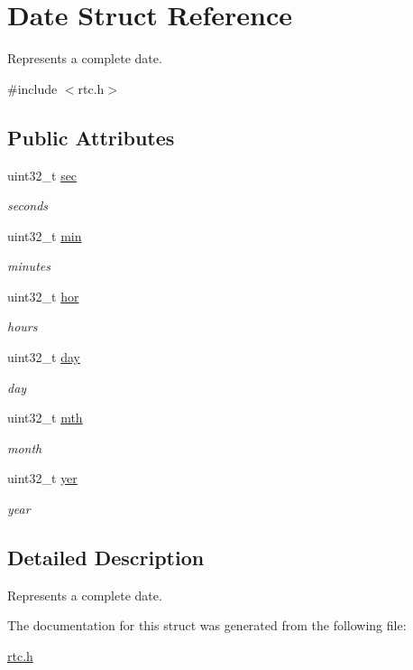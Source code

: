 \hypertarget{struct_date}{}\section{Date Struct Reference}
\label{struct_date}


Represents a complete date.  




{\ttfamily \#include $<$rtc.\+h$>$}

\subsection*{Public Attributes}
\begin{DoxyCompactItemize}
\item 
uint32\+\_\+t \mbox{\hyperlink{group__rtc_gad1dd4ea2eac5b95869aecea036e93d93}{sec}}
\begin{DoxyCompactList}\small\item\em seconds \end{DoxyCompactList}\item 
uint32\+\_\+t \mbox{\hyperlink{group__rtc_gad11927da04c378087cb0cf44cbf25759}{min}}
\begin{DoxyCompactList}\small\item\em minutes \end{DoxyCompactList}\item 
uint32\+\_\+t \mbox{\hyperlink{group__rtc_gaa5ba3c37c4f61fa5ec64580241ecdb4c}{hor}}
\begin{DoxyCompactList}\small\item\em hours \end{DoxyCompactList}\item 
uint32\+\_\+t \mbox{\hyperlink{group__rtc_gab435b6ac408b48a2edc5838cdc8aa914}{day}}
\begin{DoxyCompactList}\small\item\em day \end{DoxyCompactList}\item 
uint32\+\_\+t \mbox{\hyperlink{group__rtc_ga9441c8119c91c63a623ab4bb3a42e340}{mth}}
\begin{DoxyCompactList}\small\item\em month \end{DoxyCompactList}\item 
uint32\+\_\+t \mbox{\hyperlink{group__rtc_ga8bc3e3b0d57e50d6d4c62f76922de55e}{yer}}
\begin{DoxyCompactList}\small\item\em year \end{DoxyCompactList}\end{DoxyCompactItemize}


\subsection{Detailed Description}
Represents a complete date. 

The documentation for this struct was generated from the following file\+:\begin{DoxyCompactItemize}
\item 
\mbox{\hyperlink{rtc_8h}{rtc.\+h}}\end{DoxyCompactItemize}
